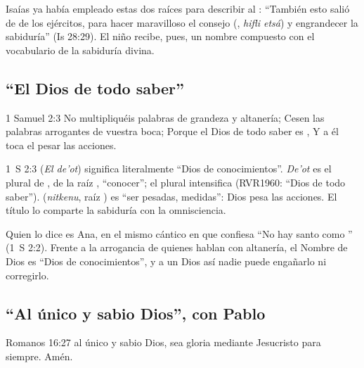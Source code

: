 Isaías ya había empleado estas dos raíces para describir al \SENOR{}: ``También esto salió de \SENOR{} de los ejércitos, para hacer maravilloso el consejo (, \emph{hifli etsá}) y engrandecer la sabiduría'' (Is 28:29). El niño recibe, pues, un nombre compuesto con el vocabulario de la sabiduría divina.


\subsection{“El Dios de todo saber”}
\begin{verso}{1 Samuel 2:3}
No multipliquéis palabras de grandeza y altanería; Cesen las palabras arrogantes de vuestra boca; Porque el Dios de todo saber es \SENOR{}, Y a él toca el pesar las acciones.
\end{verso}

\begin{filologiatexto}{1~S 2:3}
 (\emph{El de'ot}) significa literalmente ``Dios de conocimientos''. \emph{De'ot} es el plural de , de la raíz , ``conocer''; el plural intensifica (RVR1960: ``Dios de todo saber'').  (\emph{nitkenu}, raíz ) es ``ser pesadas, medidas'': Dios pesa las acciones. El título lo comparte la sabiduría con la omnisciencia.
\end{filologiatexto}


Quien lo dice es Ana, en el mismo cántico en que confiesa ``No hay santo como \SENOR{}'' (1~S 2:2). Frente a la arrogancia de quienes hablan con altanería, el Nombre de Dios es ``Dios de conocimientos'', y a un Dios así nadie puede engañarlo ni corregirlo.

\subsection{“Al único y sabio Dios”, con Pablo}
\begin{verso}{Romanos 16:27}
al único y sabio Dios, sea gloria mediante Jesucristo para siempre. Amén.
\end{verso}

